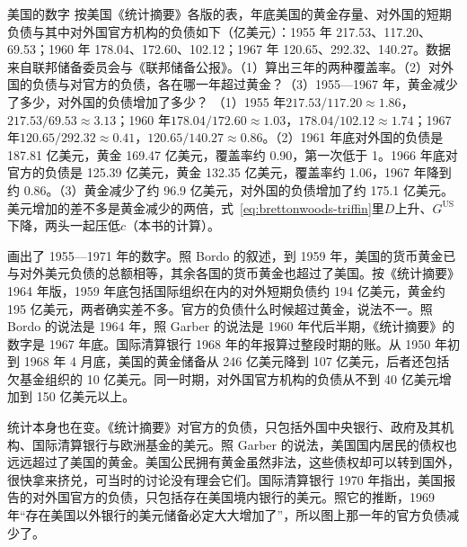 \begin{example}{美国的数字}\label{ex:brettonwoods-us}
按美国《统计摘要》各版的表，年底美国的黄金存量、对外国的短期负债与其中对外国官方机构的负债如下（亿美元）：1955 年 217.53、117.20、69.53；1960 年 178.04、172.60、102.12；1967 年 120.65、292.32、140.27\cite{statab36}。数据来自联邦储备委员会与《联邦储备公报》\cite{statab36}。（1）算出三年的两种覆盖率。（2）对外国的负债与对官方的负债，各在哪一年超过黄金？（3）1955—1967 年，黄金减少了多少，对外国的负债增加了多少？
\solution
（1）1955 年$217.53/117.20\approx1.86$，$217.53/69.53\approx3.13$；1960 年$178.04/172.60\approx1.03$，$178.04/102.12\approx1.74$；1967 年$120.65/292.32\approx0.41$，$120.65/140.27\approx0.86$。（2）1961 年底对外国的负债是 187.81 亿美元，黄金 169.47 亿美元，覆盖率约 0.90，第一次低于 1\cite{statab36}。1966 年底对官方的负债是 125.39 亿美元，黄金 132.35 亿美元，覆盖率约 1.06，1967 年降到约 0.86\cite{statab36}。（3）黄金减少了约 96.9 亿美元，对外国的负债增加了约 175.1 亿美元。美元增加的差不多是黄金减少的两倍，式~\eqref{eq:brettonwoods-triffin}里$D$上升、$G^{\mathrm{US}}$下降，两头一起压低$c$（本书的计算）。
\end{example}

画出了 1955—1971 年的数字。照 Bordo 的叙述，到 1959 年，美国的货币黄金已与对外美元负债的总额相等，其余各国的货币黄金也超过了美国\cite{bordo1993}。按《统计摘要》1964 年版，1959 年底包括国际组织在内的对外短期负债约 194 亿美元，黄金约 195 亿美元，两者确实差不多\cite{statab36}。官方的负债什么时候超过黄金，说法不一。照 Bordo 的说法是 1964 年，照 Garber 的说法是 1960 年代后半期，《统计摘要》的数字是 1967 年底\cite{bordo1993,garber1993,statab36}。国际清算银行 1968 年的年报算过整段时期的账\cite{bis36}。从 1950 年初到 1968 年 4 月底，美国的黄金储备从 246 亿美元降到 107 亿美元，后者还包括欠基金组织的 10 亿美元\cite{bis36}。同一时期，对外国官方机构的负债从不到 40 亿美元增加到 150 亿美元以上\cite{bis36}。

统计本身也在变。《统计摘要》对官方的负债，只包括外国中央银行、政府及其机构、国际清算银行与欧洲基金的美元\cite{statab36}。照 Garber 的说法，美国国内居民的债权也远远超过了美国的黄金。美国公民拥有黄金虽然非法，这些债权却可以转到国外，很快拿来挤兑，可当时的讨论没有理会它们\cite{garber1993}。国际清算银行 1970 年指出，美国报告的对外国官方的负债，只包括存在美国境内银行的美元\cite{bis36}。照它的推断，1969 年“存在美国以外银行的美元储备必定大大增加了”，所以图上那一年的官方负债减少了\cite{bis36}。

